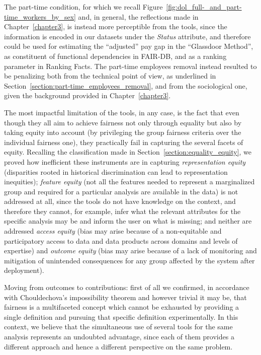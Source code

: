 The part-time condition, for which we recall Figure~\ref{fig:dol_full-_and_part-time_workers_by_sex} and, in general, the reflections made in Chapter~\ref{chapter3}, is instead more perceptible from the tools, since the information is encoded in our datasets under the \textit{Status} attribute, and therefore could be used for estimating the ``adjusted'' pay gap in the ``Glassdoor Method'', as constituent of functional dependencies in FAIR-DB, and as a ranking parameter in Ranking Facts. The part-time employees removal instead resulted to be penalizing both from the technical point of view, as underlined in Section~\ref{section:part-time_employees_removal}, and from the sociological one, given the background provided in Chapter~\ref{chapter3}.

The most impactful limitation of the tools, in any case, is the fact that even though they all aim to achieve fairness not only through equality but also by taking equity into account (by privileging the group fairness criteria over the individual fairness one), they practically fail in capturing the several facets of equity. Recalling the classification made in Section~\ref{section:equality_equity}, we proved how inefficient these instruments are in capturing \textit{representation equity} (disparities rooted in historical discrimination can lead to representation inequities); \textit{feature equity} (not all the features needed to represent a marginalized group and required for a particular analysis are available in the data) is not addressed at all, since the tools do not have knowledge on the context, and therefore they cannot, for example, infer what the relevant attributes for the specific analysis may be and inform the user on what is missing; and neither are addressed \textit{access equity} (bias may arise because of a non-equitable and participatory access to data and data products across domains and levels of expertise) and \textit{outcome equity} (bias may arise because of a lack of monitoring and mitigation of unintended consequences for any group affected by the system after deployment).

Moving from outcomes to contributions: first of all we confirmed, in accordance with Chouldechova's impossibility theorem and however trivial it may be, that fairness is a multifaceted concept which cannot be exhausted by providing a single definition and pursuing that specific definition experimentally. In this context, we believe that the simultaneous use of several tools for the same analysis represents an undoubted advantage, since each of them provides a different approach and hence a different perspective on the same problem.

